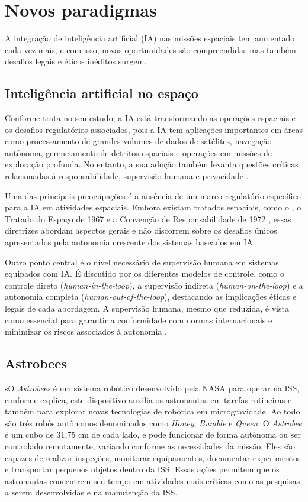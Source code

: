 \section{Novos paradigmas}

A integração de inteligência artificial (IA) nas missões espaciais tem aumentado cada vez mais, e com isso, novas oportunidades são compreendidas mas também desafios legais e éticos inéditos surgem. 

\subsection{Inteligência artificial no espaço}

Conforme \cite{martin2021} trata no seu estudo, a IA está transformando as operações espaciais e os desafios regulatórios associados, pois a IA tem aplicações importantes em áreas como processamento de grandes volumes de dados de satélites, navegação autônoma, gerenciamento de detritos espaciais e operações em missões de exploração profunda.
No entanto, a sua adoção também levanta questões críticas relacionadas à responsabilidade, supervisão humana e privacidade \cite{martin2021}.

Uma das principais preocupações é a ausência de um marco regulatório específico para a IA em atividades espaciais.
Embora existam tratados espaciais, como o \cite{unodaOuterSpaceTreaty}, o Tratado do Espaço de 1967 e a Convenção de Responsabilidade de 1972 \cite{camaraDecreto77}, essas diretrizes abordam aspectos gerais e não discorrem sobre os desafios únicos apresentados pela autonomia crescente dos sistemas baseados em IA.

Outro ponto central é o nível necessário de supervisão humana em sistemas equipados com IA.
É discutido por \cite{martin2021} os diferentes modelos de controle, como o controle direto (\emph{human-in-the-loop}), a supervisão indireta (\emph{human-on-the-loop}) e a autonomia completa (\emph{human-out-of-the-loop}), destacando as implicações éticas e legais de cada abordagem.
A supervisão humana, mesmo que reduzida, é vista como essencial para garantir a conformidade com normas internacionais e minimizar os riscos associados à autonomia \cite{martin2021}.

\subsection{Astrobees}

sO \emph{Astrobees} é um sistema robótico desenvolvido pela NASA para operar na ISS, conforme \cite{nasaAstrobee} explica, este dispositivo auxilia os astronautas em tarefas rotineiras e também para explorar novas tecnologias de robótica em microgravidade.
Ao todo são três robôs autônomos denominados como \emph{Honey}, \emph{Bumble} e \emph{Queen}.
O \emph{Astrobee} é um cubo de 31,75 cm de cada lado, e pode funcionar de forma autônoma ou ser controlado remotamente, variando conforme as necessidades da missão.
Eles são capazes de realizar inspeções, monitorar equipamentos, documentar experimentos e transportar pequenos objetos dentro da ISS. Essas ações permitem que os astronautas concentrem seu tempo em atividades mais críticas como as pesquisas a serem desenvolvidas e na manutenção da ISS.

